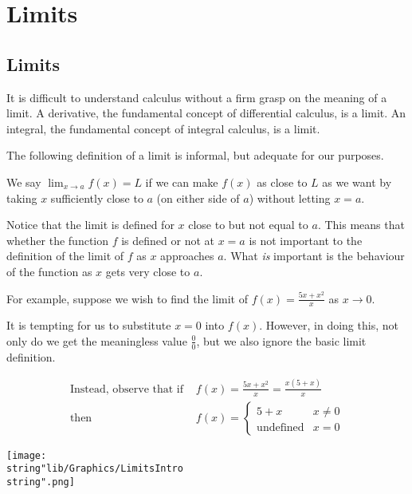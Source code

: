 \documentclass[11pt,a4paper]{book}
\begin{document}
\tableofcontents

\chapter{Limits}
\section{Limits}

It is difficult to understand calculus without a firm grasp on the
meaning of a limit. A derivative, the fundamental concept of differential
calculus, is a limit. An integral, the fundamental concept of integral
calculus, is a limit.

The following definition of a limit is informal, but adequate for
our purposes.

\begin{tcolorbox}[colback=blue!5, colframe=black, boxrule=.4pt, sharpish corners]

We say ${\displaystyle \lim_{x\rightarrow a}f\left(x\right)=L}$ if
we can make $f\left(x\right)$ as close to $L$ as we want by taking
$x$ sufficiently close to $a$ (on either side of $a$) without letting
$x=a$.
\end{tcolorbox}

Notice that the limit is defined for $x$ close to but not equal to
$a$. This means that whether the function $f$ is defined or not
at $x=a$ is not important to the definition of the limit of $f$
as $x$ approaches $a$. What \textit{is} important is the behaviour
of the function as $x$ gets very close to $a$.

For example, suppose we wish to find the limit of ${\displaystyle f\left(x\right)=\frac{5x+x^{2}}{x}}$
as $x\rightarrow0$.

It is tempting for us to substitute $x=0$ into $f\left(x\right)$.
However, in doing this, not only do we get the meaningless value $\frac{0}{0}$, but we also ignore the basic limit definition.

\begin{minipage}{.5\textwidth}

\begin{align*}
{\displaystyle \text{Instead, observe that if }} & f\left(x\right)=\frac{5x+x^{2}}{x}=\frac{x\left(5+x\right)}{x}\\
\text{then } & f\left(x\right)=\begin{cases}
5+x & x\neq0\\
\text{undefined} & x=0
\end{cases}
\end{align*}

\end{minipage}
\begin{minipage}{.5\textwidth}
\begin{center}
\texttt{[image: \\string"lib/Graphics/LimitsIntro\\string".png]}
\par\end{center}

\end{minipage}
\end{document}
